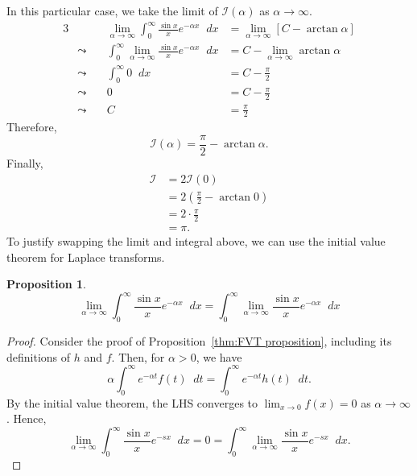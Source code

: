 \documentclass[a4paper]{article}
\newcommand*\diff{\mathop{}\!d} %
\newtheorem{proposition}[theorem]{Proposition}
\theoremstyle{definition}
\begin{document}
In this particular case, we take the limit of $\mathcal{I}(\alpha)$ as $\alpha \to \infty$.
\begin{alignat*}{3}
     &                & \lim_{\alpha \to \infty} \int_{0}^{\infty} \frac{\sin x}{x} e^{- \alpha x} \diff x & =  \lim_{\alpha \to \infty} \left[C - \arctan \alpha\right] \\
     & \leadsto \quad & \int_{0}^{\infty} \lim_{\alpha \to \infty} \frac{\sin x}{x} e^{- \alpha x} \diff x & = C - \lim_{\alpha \to \infty} \arctan \alpha               \\
     & \leadsto \quad & \int_{0}^{\infty} 0 \diff x                                                        & = C - \frac{\pi}{2}                                         \\
     & \leadsto \quad & 0                                                                                  & = C - \frac{\pi}{2}                                         \\
     & \leadsto \quad & C                                                                                  & = \frac{\pi}{2}
\end{alignat*}
Therefore,
\begin{equation*}
    \mathcal{I}(\alpha) = \frac{\pi}{2} - \arctan \alpha.
\end{equation*}
Finally,
\begin{align*}
    \mathcal{I} & = 2\mathcal{I}(0)                          \\
                & = 2 \left(\frac{\pi}{2} - \arctan 0\right) \\
                & = 2 \cdot \frac{\pi}{2}                    \\
                & = \pi.
\end{align*}
To justify swapping the limit and integral above, we can use the initial value theorem for Laplace transforms.
\begin{proposition} \label{thm:IVT proposition}
    \begin{equation*}
        \lim_{\alpha \to \infty} \int_{0}^{\infty} \frac{\sin x}{x} e^{- \alpha x} \diff x = \int_{0}^{\infty} \lim_{\alpha \to \infty} \frac{\sin x}{x} e^{- \alpha x} \diff x
    \end{equation*}
\end{proposition}
\begin{proof}
    Consider the proof of Proposition~\ref{thm:FVT proposition}, including its definitions of $h$ and $f$.
    Then, for $\alpha>0$, we have
    \begin{equation*}
        \alpha \int_{0}^{\infty} e^{-\alpha t} f(t) \diff t = \int_{0}^{\infty} e^{-\alpha t} h(t) \diff t.
    \end{equation*}
    By the initial value theorem, the LHS converges to $\lim_{x \to 0} f(x) = 0$ as $\alpha \to \infty$.
    Hence,
    \begin{equation*}
        \lim_{\alpha\to \infty} \int_{0}^{\infty} \frac{\sin x}{x} e^{-sx} \diff x = 0 = \int_{0}^{\infty} \lim_{\alpha \to \infty} \frac{\sin x}{x} e^{-sx} \diff x.
    \end{equation*}
\end{proof}
\end{document}
